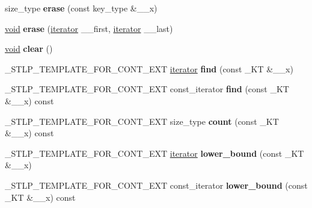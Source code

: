 \begin{DoxyCompactItemize}
\mbox{\label{classmultimap_a9a2493aec6c9c56f063c13dfff6c5a17}} 
size\+\_\+type {\bfseries erase} (const key\+\_\+type \&\+\_\+\+\_\+x)
\item 
\mbox{\label{classmultimap_ac705fd1a9168a4f747883b419280d394}} 
\hyperlink{interfacevoid}{void} {\bfseries erase} (\hyperlink{structiterator}{iterator} \+\_\+\+\_\+first, \hyperlink{structiterator}{iterator} \+\_\+\+\_\+last)
\item 
\mbox{\label{classmultimap_ad3b82aa936f0dbc87f0db1bdf5066b8d}} 
\hyperlink{interfacevoid}{void} {\bfseries clear} ()
\item 
\mbox{\label{classmultimap_acf6da21d6182133d8242bdf028747a26}} 
\+\_\+\+S\+T\+L\+P\+\_\+\+T\+E\+M\+P\+L\+A\+T\+E\+\_\+\+F\+O\+R\+\_\+\+C\+O\+N\+T\+\_\+\+E\+XT \hyperlink{structiterator}{iterator} {\bfseries find} (const \+\_\+\+KT \&\+\_\+\+\_\+x)
\item 
\mbox{\label{classmultimap_ac35e7b63b135f0b9d90607c9c1a70966}} 
\+\_\+\+S\+T\+L\+P\+\_\+\+T\+E\+M\+P\+L\+A\+T\+E\+\_\+\+F\+O\+R\+\_\+\+C\+O\+N\+T\+\_\+\+E\+XT const\+\_\+iterator {\bfseries find} (const \+\_\+\+KT \&\+\_\+\+\_\+x) const
\item 
\mbox{\label{classmultimap_ae1936b14c1128d07b69ca80476f967e5}} 
\+\_\+\+S\+T\+L\+P\+\_\+\+T\+E\+M\+P\+L\+A\+T\+E\+\_\+\+F\+O\+R\+\_\+\+C\+O\+N\+T\+\_\+\+E\+XT size\+\_\+type {\bfseries count} (const \+\_\+\+KT \&\+\_\+\+\_\+x) const
\item 
\mbox{\label{classmultimap_a7dd299b919254ff1ba1bd0a7e8aa3302}} 
\+\_\+\+S\+T\+L\+P\+\_\+\+T\+E\+M\+P\+L\+A\+T\+E\+\_\+\+F\+O\+R\+\_\+\+C\+O\+N\+T\+\_\+\+E\+XT \hyperlink{structiterator}{iterator} {\bfseries lower\+\_\+bound} (const \+\_\+\+KT \&\+\_\+\+\_\+x)
\item 
\mbox{\label{classmultimap_a2e536b307647fd09d7f4c16ccab9555d}} 
\+\_\+\+S\+T\+L\+P\+\_\+\+T\+E\+M\+P\+L\+A\+T\+E\+\_\+\+F\+O\+R\+\_\+\+C\+O\+N\+T\+\_\+\+E\+XT const\+\_\+iterator {\bfseries lower\+\_\+bound} (const \+\_\+\+KT \&\+\_\+\+\_\+x) const
\item 
\mbox{\label{classmultimap_ab7b69ed2d6593083510929008a317415}} 

\end{DoxyCompactItemize}
